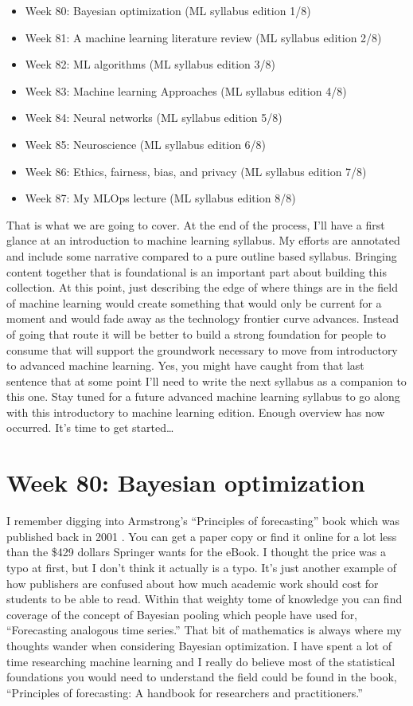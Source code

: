 \documentclass{article}
\begin{document}
\begin{itemize}
\item Week 80: Bayesian optimization (ML syllabus edition 1/8)
\item Week 81: A machine learning literature review (ML syllabus edition 2/8)
\item Week 82: ML algorithms (ML syllabus edition 3/8)
\item Week 83: Machine learning Approaches (ML syllabus edition 4/8)
\item Week 84: Neural networks (ML syllabus edition 5/8)
\item Week 85: Neuroscience (ML syllabus edition 6/8)
\item Week 86: Ethics, fairness, bias, and privacy (ML syllabus edition 7/8)
\item Week 87: My MLOps lecture (ML syllabus edition 8/8)
\end{itemize}

That is what we are going to cover. At the end of the process, I’ll have a first glance at an introduction to machine learning syllabus. My efforts are annotated and include some narrative compared to a pure outline based syllabus. Bringing content together that is foundational is an important part about building this collection. At this point, just describing the edge of where things are in the field of machine learning would create something that would only be current for a moment and would fade away as the technology frontier curve advances. Instead of going that route it will be better to build a strong foundation for people to consume that will support the groundwork necessary to move from introductory to advanced machine learning. Yes, you might have caught from that last sentence that at some point I’ll need to write the next syllabus as a companion to this one. Stay tuned for a future advanced machine learning syllabus to go along with this introductory to machine learning edition. Enough overview has now occurred. It’s time to get started…

\section{Week 80: Bayesian optimization}
I remember digging into Armstrong’s “Principles of forecasting” book which was published back in 2001 \cite{armstrong2001principles}. You can get a paper copy or find it online for a lot less than the \$429 dollars Springer wants for the eBook. I thought the price was a typo at first, but I don’t think it actually is a typo. It’s just another example of how publishers are confused about how much academic work should cost for students to be able to read. Within that weighty tome of knowledge you can find coverage of the concept of Bayesian pooling which people have used for, “Forecasting analogous time series.” That bit of mathematics is always where my thoughts wander when considering Bayesian optimization. I have spent a lot of time researching machine learning and I really do believe most of the statistical foundations you would need to understand the field could be found in the book, “Principles of forecasting: A handbook for researchers and practitioners.” 
\end{document}
